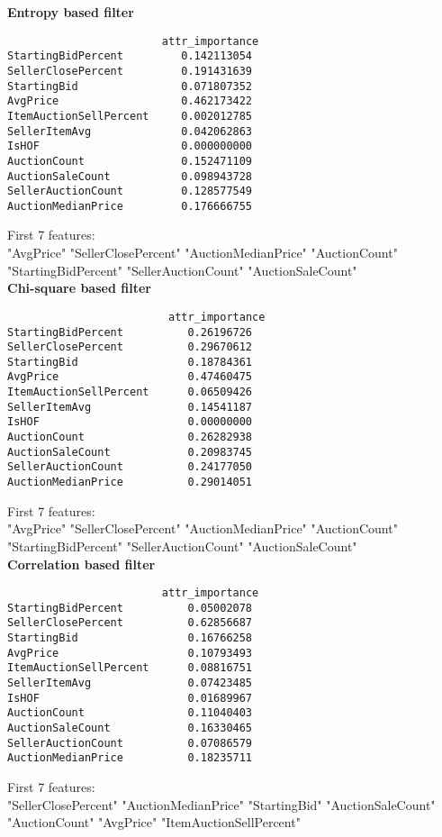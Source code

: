 \documentclass{article}
\begin{document}
\textbf{Entropy based filter}
\begin{verbatim}
                        attr_importance
StartingBidPercent         0.142113054
SellerClosePercent         0.191431639
StartingBid                0.071807352
AvgPrice                   0.462173422
ItemAuctionSellPercent     0.002012785
SellerItemAvg              0.042062863
IsHOF                      0.000000000
AuctionCount               0.152471109
AuctionSaleCount           0.098943728
SellerAuctionCount         0.128577549
AuctionMedianPrice         0.176666755
\end{verbatim}

First 7 features:\\
"AvgPrice"           "SellerClosePercent" "AuctionMedianPrice" "AuctionCount"      "StartingBidPercent" "SellerAuctionCount" "AuctionSaleCount"  
\\

\textbf{Chi-square based filter}
\begin{verbatim}
                         attr_importance
StartingBidPercent          0.26196726
SellerClosePercent          0.29670612
StartingBid                 0.18784361
AvgPrice                    0.47460475
ItemAuctionSellPercent      0.06509426
SellerItemAvg               0.14541187
IsHOF                       0.00000000
AuctionCount                0.26282938
AuctionSaleCount            0.20983745
SellerAuctionCount          0.24177050
AuctionMedianPrice          0.29014051
\end{verbatim}

First 7 features:\\
"AvgPrice"           "SellerClosePercent" "AuctionMedianPrice" "AuctionCount"      "StartingBidPercent" "SellerAuctionCount" "AuctionSaleCount"   
\\

\textbf{Correlation based filter}
\begin{verbatim}
                        attr_importance
StartingBidPercent          0.05002078
SellerClosePercent          0.62856687
StartingBid                 0.16766258
AvgPrice                    0.10793493
ItemAuctionSellPercent      0.08816751
SellerItemAvg               0.07423485
IsHOF                       0.01689967
AuctionCount                0.11040403
AuctionSaleCount            0.16330465
SellerAuctionCount          0.07086579
AuctionMedianPrice          0.18235711
\end{verbatim}

First 7 features:\\
"SellerClosePercent"     "AuctionMedianPrice"     "StartingBid" "AuctionSaleCount"       "AuctionCount"           "AvgPrice"   "ItemAuctionSellPercent"  
\\
\end{document}
